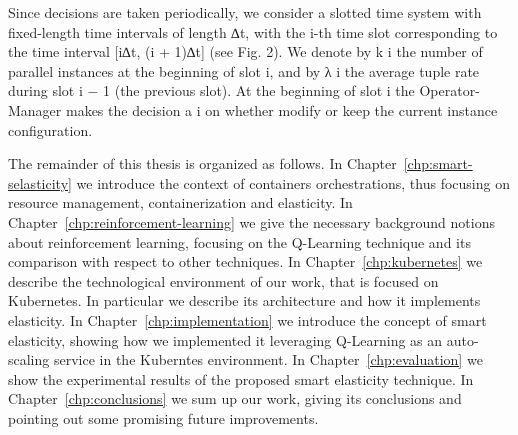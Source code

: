 Since decisions are taken periodically, we consider a slotted time system with
fixed-length time intervals of length ∆t, with the i-th time slot corresponding
to the time interval [i∆t, (i + 1)∆t] (see Fig. 2). We denote by k i the number
of parallel instances at the beginning of slot i, and by λ i the average tuple rate
during slot i − 1 (the previous slot). At the beginning of slot i the Operator-
Manager makes the decision a i on whether modify or keep the current instance
configuration.


The remainder of this thesis is organized as follows.
%
In Chapter~\ref{chp:smart-selasticity} we introduce the context of containers orchestrations, thus focusing on resource management, containerization and elasticity.
%
In Chapter~\ref{chp:reinforcement-learning} we give the necessary background notions about reinforcement learning, focusing on the Q-Learning technique and its comparison with respect to other techniques.
%
In Chapter~\ref{chp:kubernetes} we describe the technological environment of our work, that is focused on Kubernetes. In particular we describe its architecture and how it implements elasticity.
%
In Chapter~\ref{chp:implementation} we introduce the concept of smart elasticity, showing how we implemented it leveraging Q-Learning as an auto-scaling service in the Kuberntes environment.
%
In Chapter~\ref{chp:evaluation} we show the experimental results of the proposed smart elasticity technique.
%
In Chapter~\ref{chp:conclusions} we sum up our work, giving its conclusions and pointing out some promising future improvements.

